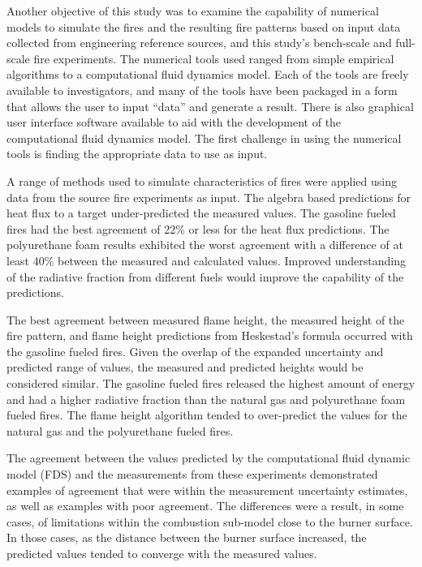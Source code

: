 \documentclass[twoside]{uocthesis}
\begin{document}
{Another objective of this study was to examine the capability of numerical models to simulate the fires and the resulting fire patterns based on input data collected from engineering reference sources, and this study's bench-scale and full-scale fire experiments.  The numerical tools used ranged from simple empirical algorithms to a computational fluid dynamics model.  Each of the tools are freely available to investigators, and many of the tools have been packaged in a form that allows the user to input ``data'' and generate a result.  There is also graphical user interface software available to aid with the development of the computational fluid dynamics model.  The first challenge in using the numerical tools is finding the appropriate data to use as input.        

A range of methods used to simulate characteristics of fires were applied using data from the source fire experiments as input.  The algebra based predictions for heat flux to a target under-predicted the measured values.  The gasoline fueled fires had the best agreement of 22\% or less for the heat flux predictions.  The polyurethane foam results exhibited the worst agreement with a difference of at least 40\% between the measured and calculated values.  Improved understanding of the radiative fraction from different fuels would improve the capability of the predictions.  

The best agreement between measured flame height, the measured height of the fire pattern, and flame height predictions from Heskestad's formula occurred with the gasoline fueled fires.  Given the overlap of the expanded uncertainty and predicted range of values, the measured and predicted heights would be considered similar.  The gasoline fueled fires released the highest amount of energy and had a higher radiative fraction than the natural gas and polyurethane foam fueled fires. The flame height algorithm tended to over-predict the values for the natural gas and the polyurethane fueled fires. 

The agreement between the values predicted by the computational fluid dynamic model (FDS) and the measurements from these experiments demonstrated examples of agreement that were within the measurement uncertainty estimates, as well as examples with poor agreement.  The differences were a result, in some cases, of limitations within the combustion sub-model close to the burner surface.  In those cases, as the distance between the burner surface increased, the predicted values tended to converge with the measured values.

}
\end{document}
